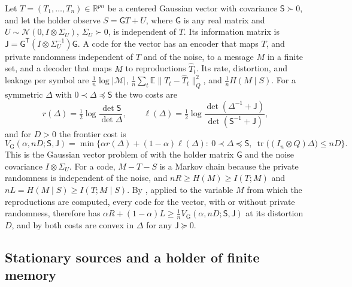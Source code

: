 \documentclass[11pt,onecolumn]{IEEEtran}
\newcommand{\E}{\mathbb{E}}
\newcommand{\R}{\mathbb{R}}
\newcommand{\tr}{\operatorname{tr}}
\newcommand{\VG}{V_{\mathrm G}}
\begin{document}
Let $T=(T_1,\dots,T_n)\in\R^{pn}$ be a centered Gaussian vector with
covariance $\mathsf S\succ0$, and let the holder observe $S=\mathsf GT+U$,
where $\mathsf G$ is any real matrix and $U\sim\mathcal N(0,I\otimes\Sigma_U)$,
$\Sigma_U\succ0$, is independent of $T$. Its information matrix is
$\mathsf J=\mathsf G^{\mathsf T}(I\otimes\Sigma_U^{-1})\mathsf G$. A code for
the vector has an encoder that maps $T$, and private randomness
independent of $T$ and of the noise, to a message $M$ in a finite set,
and a decoder that maps $M$ to reproductions $\hat T_t$. Its rate,
distortion, and leakage per symbol are $\tfrac1n\log|\mathcal M|$,
$\tfrac1n\sum_t\E\|T_t-\hat T_t\|_Q^2$, and $\tfrac1nH(M\mid S)$. For a
symmetric $\Delta$ with $0\prec\Delta\preceq\mathsf S$ the two costs are
\begin{equation}
r(\Delta)=\tfrac12\log\frac{\det\mathsf S}{\det\Delta},\qquad
\ell(\Delta)=\tfrac12\log\frac{\det(\Delta^{-1}+\mathsf J)}{\det(\mathsf S^{-1}+\mathsf J)},
\label{eq:costs}
\end{equation}
and for $D>0$ the frontier cost is
\[
\VG(\alpha,nD;\mathsf S,\mathsf J)=\min\bigl\{\alpha r(\Delta)+(1-\alpha)\ell(\Delta):\ 0\prec\Delta\preceq\mathsf S,\ \tr\bigl((I_n\otimes Q)\Delta\bigr)\le nD\bigr\}.
\]
This is the Gaussian vector problem of \cite{part1} with the holder
matrix $\mathsf G$ and the noise covariance $I\otimes\Sigma_U$. For a code,
$M-T-S$ is a Markov chain because the private randomness is independent
of the noise, and $n R\ge H(M)\ge I(T;M)$ and $nL=H(M\mid S)\ge I(T;M\mid S)$.
By \cite[Proposition~2]{part1}, applied to the variable $M$ from which
the reproductions are computed, every code for the vector, with or
without private randomness, therefore has
$\alpha R+(1-\alpha)L\ge\tfrac1n\VG(\alpha,nD;\mathsf S,\mathsf J)$ at its
distortion $D$, and by \cite[Theorem~5]{part1} both costs are convex
in $\Delta$ for any $\mathsf J\succeq0$.

\subsection{Stationary sources and a holder of finite memory}
\end{document}
